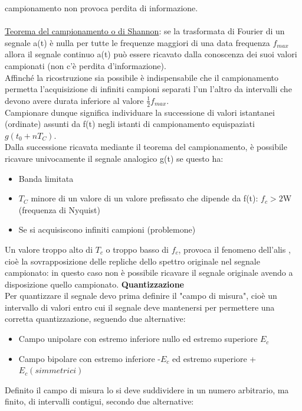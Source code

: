 \documentclass{article}
\begin{document}
campionamento non provoca perdita di informazione. \\\\
\underline{Teorema del campionamento o di Shannon}: se la trasformata di Fourier di un segnale a(t) è nulla per tutte le frequenze maggiori di una data frequenza $f_{max}$ allora il segnale continuo a(t) può 
essere ricavato dalla conoscenza dei suoi valori campionati (non c'è perdita d'informazione).\\ Affinché la ricostruzione sia possibile è 
indispensabile che il campionamento permetta l'acquisizione di infiniti campioni separati l'un 
l’altro da intervalli che devono avere durata inferiore al valore $\frac{1}{2}f_{max}$.\\ 
Campionare dunque significa individuare la successione di valori istantanei (ordinate) assunti da f(t) negli 
istanti di campionamento equispaziati $g(t_{0}+nT_{C})$. \\
Dalla successione ricavata mediante il teorema del campionamento, è possibile ricavare univocamente il segnale analogico g(t) se questo ha: 
\begin{itemize}
    \item Banda limitata 
    \item $T_{C}$ minore di un valore di un valore prefissato che dipende da f(t): $f_{c} > 2$W (frequenza di Nyquist)
    \item Se si acquisiscono infiniti campioni (problemone)
\end{itemize}
Un valore troppo alto di $T_{c}$ o troppo basso di $f_{c}$, provoca il fenomeno dell’alis , cioè la 
sovrapposizione delle repliche dello spettro originale nel segnale campionato: in questo caso non è possibile ricavare il segnale originale avendo a disposizione quello campionato.
\newpage
\noindent
\textbf{Quantizzazione}\\
Per quantizzare il segnale devo prima definire il "campo di misura", cioè un intervallo di valori entro cui il segnale deve 
mantenersi per permettere una corretta quantizzazione, seguendo due alternative: 
\begin{itemize}
    \item Campo unipolare con estremo inferiore nullo ed estremo superiore $E_{c}$ 
    \item Campo bipolare con estremo inferiore -$E_{c}$ ed estremo superiore +$E_{c} (simmetrici)$ 
\end{itemize}
Definito il campo di misura lo si deve suddividere in un numero arbitrario, ma finito, di intervalli 
contigui, secondo due alternative: 
\end{document}
